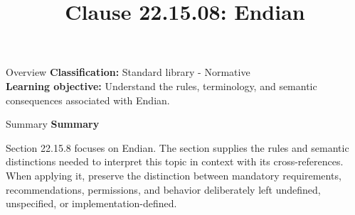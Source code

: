 \documentclass[10pt,letterpaper]{article}
\title{Clause 22.15.08: Endian}
\author{}
\date{}
\begin{document}
\maketitle
\begin{CornellOverviewBox}{Overview}
\textbf{Classification:} Standard library - Normative\\[2pt]
\textbf{Learning objective:} Understand the rules, terminology, and semantic consequences associated with Endian.
\end{CornellOverviewBox}\begin{CornellSummaryBox}{Summary}
{\sffamily\bfseries\color{Accent} Summary}\par\vspace{3pt}Section 22.15.8 focuses on Endian. The section supplies the rules and semantic distinctions needed to interpret this topic in context with its cross-references. When applying it, preserve the distinction between mandatory requirements, recommendations, permissions, and behavior deliberately left undefined, unspecified, or implementation-defined.
\end{CornellSummaryBox}
\end{document}

